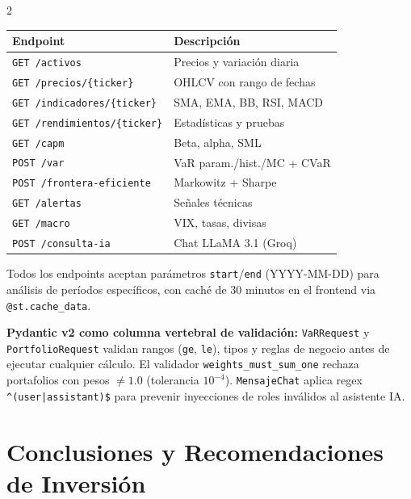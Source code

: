 \documentclass[10pt,a4paper]{article}
\begin{document}
\begin{multicols}{2}
{\footnotesize
\begin{tabular}{@{}ll@{}}
\toprule
\textbf{Endpoint} & \textbf{Descripción} \\
\midrule
\texttt{GET /activos}             & Precios y variación diaria \\
\texttt{GET /precios/\{ticker\}}  & OHLCV con rango de fechas \\
\texttt{GET /indicadores/\{ticker\}} & SMA, EMA, BB, RSI, MACD \\
\texttt{GET /rendimientos/\{ticker\}} & Estadísticas y pruebas \\
\texttt{GET /capm}                & Beta, alpha, SML \\
\texttt{POST /var}                & VaR param./hist./MC + CVaR \\
\texttt{POST /frontera-eficiente} & Markowitz + Sharpe \\
\texttt{GET /alertas}             & Señales técnicas \\
\texttt{GET /macro}               & VIX, tasas, divisas \\
\texttt{POST /consulta-ia}        & Chat LLaMA 3.1 (Groq) \\
\bottomrule
\end{tabular}
}

\vspace{4pt}
Todos los endpoints aceptan parámetros \texttt{start}/\texttt{end} (YYYY-MM-DD) para análisis de períodos específicos, con caché de 30 minutos en el frontend via \texttt{@st.cache\_data}.

\end{multicols}

\begin{highlightbox}
\footnotesize\textbf{Pydantic v2 como columna vertebral de validación:}
\texttt{VaRRequest} y \texttt{PortfolioRequest} validan rangos (\texttt{ge}, \texttt{le}), tipos y reglas de negocio antes de ejecutar cualquier cálculo. El validador \texttt{weights\_must\_sum\_one} rechaza portafolios con pesos $\neq 1.0$ (tolerancia $10^{-4}$). \texttt{MensajeChat} aplica regex \texttt{\^{}(user|assistant)\$} para prevenir inyecciones de roles inválidos al asistente IA.
\end{highlightbox}

\section{Conclusiones y Recomendaciones de Inversión}
\end{document}

